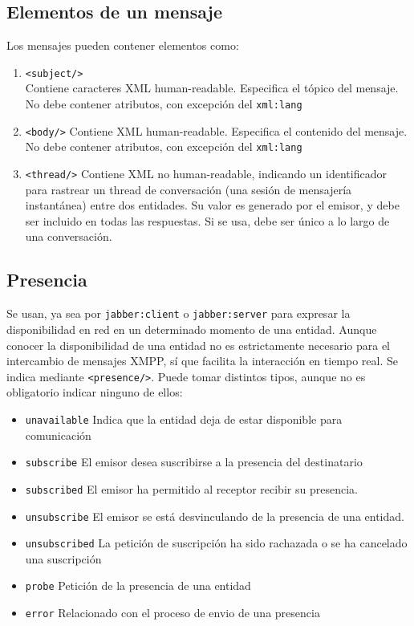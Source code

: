 \documentclass[a4paper, 11pt]{article} %
\begin{document}
  \subsection{Elementos de un mensaje}
    Los mensajes pueden contener elementos como:
    \begin{enumerate}
     \item \texttt{<subject/>}\\
     Contiene caracteres XML human-readable. Especifica el tópico del mensaje. No debe contener atributos, con excepción
     del \texttt{xml:lang}
     \item \texttt{<body/>}
     Contiene XML human-readable. Especifica el contenido del mensaje. No debe contener atributos, con excepción
     del \texttt{xml:lang}
     \item \texttt{<thread/>}
     Contiene XML no human-readable, indicando un identificador para rastrear un thread de conversación (una sesión de
     mensajería instantánea) entre dos entidades. Su valor es generado por el emisor, y debe ser incluido en todas 
     las respuestas. Si se usa, debe ser único a lo largo de una conversación.
    \end{enumerate}

  \subsection{Presencia}
    Se usan, ya sea por \texttt{jabber:client} o \texttt{jabber:server} para expresar la disponibilidad en red en un
    determinado momento de una entidad. Aunque conocer la disponibilidad de una entidad no es estrictamente
    necesario para el intercambio de mensajes XMPP, sí que facilita la interacción en tiempo real. Se indica 
    mediante \texttt{<presence/>}. Puede tomar distintos tipos, aunque no es obligatorio indicar ninguno de ellos:
    \begin{itemize}
     \item \texttt{unavailable} Indica que la entidad deja de estar disponible para comunicación
     \item \texttt{subscribe} El emisor desea suscribirse a la presencia del destinatario %
     \item \texttt{subscribed} El emisor ha permitido al receptor recibir su presencia.
     \item \texttt{unsubscribe} El emisor se está desvinculando de la presencia de una entidad.
     \item \texttt{unsubscribed} La petición de suscripción ha sido rachazada o se ha cancelado una suscripción
     \item \texttt{probe} Petición de la presencia de una entidad
     \item \texttt{error} Relacionado con el proceso de envio de una presencia
    \end{itemize}
    
\end{document}
